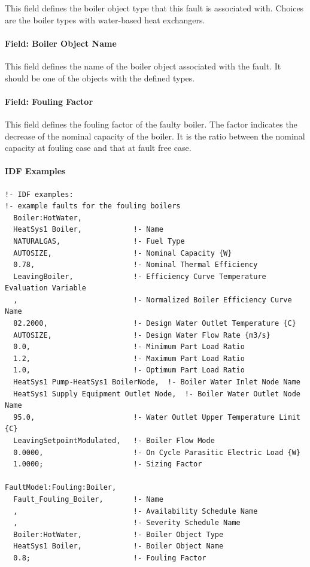This field defines the boiler object type that this fault is associated with. Choices are the boiler types with water-based heat exchangers.

\paragraph{Field: Boiler Object Name}\label{field-boiler-object-name}

This field defines the name of the boiler object associated with the fault. It should be one of the objects with the defined types.

\paragraph{Field: Fouling Factor}

This field defines the fouling factor of the faulty boiler. The factor indicates the decrease of the nominal capacity of the boiler. It is the ratio between the nominal capacity at fouling case and that at fault free case.

\paragraph{IDF Examples}

\begin{lstlisting}
!- IDF examples:
!- example faults for the fouling boilers
  Boiler:HotWater,
  HeatSys1 Boiler,            !- Name
  NATURALGAS,                 !- Fuel Type
  AUTOSIZE,                   !- Nominal Capacity {W}
  0.78,                       !- Nominal Thermal Efficiency
  LeavingBoiler,              !- Efficiency Curve Temperature Evaluation Variable
  ,                           !- Normalized Boiler Efficiency Curve Name
  82.2000,                    !- Design Water Outlet Temperature {C}
  AUTOSIZE,                   !- Design Water Flow Rate {m3/s}
  0.0,                        !- Minimum Part Load Ratio
  1.2,                        !- Maximum Part Load Ratio
  1.0,                        !- Optimum Part Load Ratio
  HeatSys1 Pump-HeatSys1 BoilerNode,  !- Boiler Water Inlet Node Name
  HeatSys1 Supply Equipment Outlet Node,  !- Boiler Water Outlet Node Name
  95.0,                       !- Water Outlet Upper Temperature Limit {C}
  LeavingSetpointModulated,   !- Boiler Flow Mode
  0.0000,                     !- On Cycle Parasitic Electric Load {W}
  1.0000;                     !- Sizing Factor

FaultModel:Fouling:Boiler,
  Fault_Fouling_Boiler,       !- Name
  ,                           !- Availability Schedule Name
  ,                           !- Severity Schedule Name
  Boiler:HotWater,            !- Boiler Object Type
  HeatSys1 Boiler,            !- Boiler Object Name
  0.8;                        !- Fouling Factor
\end{lstlisting}


